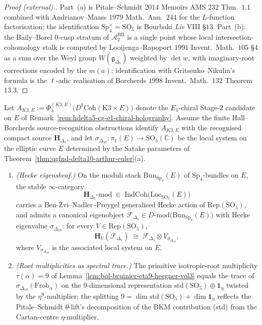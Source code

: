 \begin{proof}[Proof (external).]
Part~(a) is Pitale--Schmidt $2014$ Memoirs AMS $232$ Thm.~$1.1$
combined with Andrianov--Maass $1979$ Math.\ Ann.\ $244$ for the
$L$-function factorisation; the identification
$\mathrm{Sp}_4^{\vee}=\mathrm{SO}_5$ is Bourbaki \emph{Lie} VIII
\S$13$. Part~(b): the Baily--Borel $0$-cusp stratum of
$\mathcal A_2^{\mathrm{BB}}$ is a single point whose local
intersection-cohomology stalk is computed by Looijenga--Rapoport
$1991$ Invent.\ Math.\ $105$ \S$4$ as a sum over the Weyl group
$W(\mathfrak g_{\Delta_5})$ weighted by $\det w$, with imaginary-root
corrections encoded by the $m(a)$; identification with
Gritsenko--Nikulin's formula is the $\ell$-adic realisation of
Borcherds $1998$ Invent.\ Math.\ $132$ Theorem~$13.3$.
\end{proof}

\begin{conjecture}
\label{conj:qgfnd-delta5-hecke-eigensheaf}
Let
$A_{K3,E}:=\Phi_3^{(K3,E)}\bigl(D^b\mathrm{Coh}(\mathrm{K3}\times E)\bigr)$
denote the $E_1$-chiral Stage-$2$ candidate on $E$ of
Remark~\ref{rem:hdelta5-cg-e1-chiral-holography}. Assume the finite
 Hall--Borcherds source-recognition obstructions identify $A_{K3,E}$ with the
recognised compact source $\mathbf H_{\Delta_5}$, and let
$\sigma_{\Delta_{10}}\colon\pi_1(E)\to\mathrm{SO}_5(\mathbb C)$ be the
local system on the elliptic curve $E$ determined by the Satake
parameters of
Theorem~\ref{thm:qgfnd-delta10-arthur-euler}(a).
\begin{enumerate}[label=(\alph*),leftmargin=1.5em]
 \item \emph{(Hecke eigensheaf.)} On the moduli stack
 $\mathrm{Bun}_{\mathrm{Sp}_4}(E)$ of $\mathrm{Sp}_4$-bundles on $E$,
 the stable $\infty$-category
 \[
 \mathbf H_{\Delta_5}\text{-}\mathrm{mod}\;\in\;\mathrm{IndCoh}\bigl(\mathrm{Loc}_{\mathrm{SO}_5}(E)\bigr)
 \]
 carries a Ben-Zvi--Nadler--Preygel generalised Hecke action of
 $\mathrm{Rep}(\mathrm{SO}_5)$, and admits a canonical eigenobject
 $\mathcal F_{\Delta_5}\in D\text{-}\mathrm{mod}\bigl(\mathrm{Bun}_{\mathrm{Sp}_4}(E)\bigr)$
 with Hecke eigenvalue $\sigma_{\Delta_{10}}$: for every
 $V\in\mathrm{Rep}(\mathrm{SO}_5)$,
 \[
 \mathbf H_V(\mathcal F_{\Delta_5})\;\cong\;\mathcal F_{\Delta_5}\otimes V_{\sigma_{\Delta_{10}}},
 \]
 where $V_{\sigma_{\Delta_{10}}}$ is the associated local system
 on $E$.
 \item \emph{(Root multiplicities as spectral trace.)} The primitive
 isotropic-root multiplicity $\tau(\alpha)=9$ of
 Lemma~\ref{lem:bol-bruinier-eta9-heegner-vol3} equals the trace
 of $\sigma_{\Delta_{10}}(\mathrm{Frob}_\alpha)$ on the
 $9$-dimensional representation
 $\mathrm{std}(\mathrm{SO}_5)\oplus\mathbf 1_{\eta}$ twisted by the
 $\eta^9$-multiplier: the splitting
 $9=\dim\mathrm{std}(\mathrm{SO}_5)+\dim\mathbf 1_\eta$ reflects the
 Pitale--Schmidt $\theta$-lift's decomposition of the BKM
 contribution (std) from the Cartan-centre $\eta$-multiplier.
\end{enumerate}
\end{conjecture}

